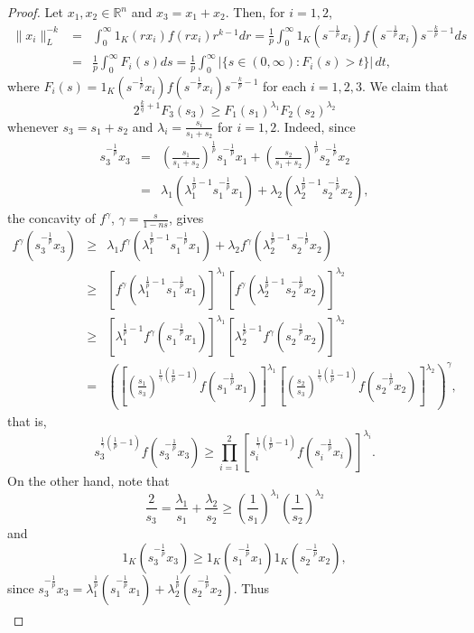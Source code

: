 \documentclass[12pt]{amsart} %
\renewcommand{\[}{\left[}
\renewcommand{\(}{\left(}
\renewcommand{\]}{\right]}
\renewcommand{\)}{\right)}
\renewcommand{\ge}{\geqslant}
\newcommand{\ga}{\gamma}
\newcommand{\la}{\lambda}
\newcommand{\R}{\mathbb R}              %
\begin{document}
\begin{proof}
Let $x_1,x_2 \in \R^{n}$ and $x_3=x_1+x_2$. Then, for $i=1,2$,
\begin{eqnarray*}
\|x_i\|_L^{-k} &=& \int_0^\infty 1_K(rx_i) f(rx_i)r^{k-1}dr =
\frac 1p\int_0^\infty 1_K(s^{-\frac 1p}x_i) f(s^{-\frac 1p}x_i) s^{-\frac kp-1}ds \\
&=& \frac 1p\int_0^\infty F_i(s)ds =
\frac 1p\int_0^\infty \Big|\{s \in (0,\infty) : F_i(s)>t\}\Big|\, dt,
\end{eqnarray*}
where $F_i(s) = 1_K(s^{-\frac 1p}x_i) f(s^{-\frac 1p}x_i)
s^{-\frac kp-1}$ for each $i=1,2,3$.  We claim that
$$
2^{\frac kq+1} F_3(s_3) \ge F_1(s_1)^{\la_1}F_2(s_2)^{\la_2}
$$
whenever $s_3 = s_1 + s_2$ and $\la_i = \frac{s_i}{s_1+s_2}$ for
$i=1,2$. Indeed, since
\begin{eqnarray*}
s_3^{-\frac 1p}x_3 &=& \left(\frac{s_1}{s_1+s_2}\right)^{\frac
1p}s_1^{-\frac 1p}x_1 + \left(\frac{s_2}{s_1+s_2}\right)^{\frac
1p}s_2^{-\frac 1p}x_2 \\
&=& \la_1(\la_1^{\frac 1p -1}s_1^{-\frac 1p}x_1) +
\la_2(\la_2^{\frac 1p -1}s_2^{-\frac 1p}x_2),
\end{eqnarray*}
the concavity of $f^\ga$, $\ga=\frac{s}{1-ns}$, gives
\begin{eqnarray*}
f^\ga(s_3^{-\frac 1p}x_3) &\ge& \la_1 f^\ga(\la_1^{\frac 1p-1}s_1^{-\frac 1p}x_1)
+ \la_2 f^\ga(\la_2^{\frac 1p -1}s_2^{-\frac 1p}x_2) \\
&\ge& \[ f^\ga(\la_1^{\frac 1p -1}s_1^{-\frac 1p}x_1)\]^{\la_1}
\[f^\ga(\la_2^{\frac 1p -1}s_2^{-\frac 1p}x_2) \]^{\la_2}\\
&\ge& \[\la_1^{\frac 1p -1} f^\ga(s_1^{-\frac 1p}x_1)\]^{\la_1}
\[\la_2^{\frac 1p -1}f^\ga(s_2^{-\frac 1p}x_2) \]^{\la_2}\\
&=& \( \[\(\frac{s_1}{s_3}\)^{\frac 1\ga(\frac 1p-1)} f(s_1^{-\frac 1p}x_1) \]^{\la_1}
\[\(\frac{s_2}{s_3}\)^{\frac 1\ga(\frac 1p -1)} f(s_2^{-\frac 1p}x_2) \]^{\la_2} \)^\ga ,
\end{eqnarray*}
that is,
$$
s_3^{\frac 1\ga(\frac 1p -1)} f(s_3^{-\frac 1p}x_3) \ge
\prod_{i=1}^2 \left[ s_i^{\frac 1\ga(\frac 1p -1)} f(s_i^{-\frac 1p}x_i) \right]^{\la_i}.
$$
On the other hand, note that
$$
\frac{2}{s_3} = \frac{\la_1}{s_1} + \frac{\la_2}{s_2}
\ge \(\frac{1}{s_1}\)^{\la_1} \(\frac{1}{s_2}\)^{\la_2}
$$ and
$$
1_K(s_3^{-\frac 1p}x_3) \ge 1_K(s_1^{-\frac 1p}x_1) 1_K(s_2^{-\frac 1p}x_2),
$$
since $s_3^{-\frac 1p}x_3 = \la_1^{\frac 1p}(s_1^{-\frac 1p}x_1) + \la_2^{\frac 1p
}(s_2^{-\frac 1p}x_2)$. Thus
\begin{eqnarray*}

\end{eqnarray*}
\end{proof}
\end{document}
